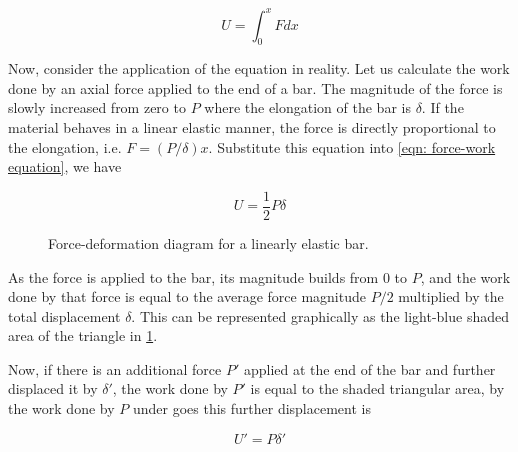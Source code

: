 \documentclass[
10pt,
a4paper,
openany,
svgnames,
]{book} %
\begin{document}
\begin{equation} \label{eqn: force-work equation}
  U = \int_0^x F dx
\end{equation}

Now, consider the application of the equation in reality. Let us calculate the work done by an axial force applied to the end of a bar. The magnitude of the force is slowly increased from zero to $P$ where the elongation of the bar is $\delta$. If the material behaves in a linear elastic manner, the force is directly proportional to the elongation, i.e. $F = (P/\delta)x$. Substitute this equation into \cref{eqn: force-work equation}, we have

\begin{equation}
  U = \frac{1}{2} P \delta
\end{equation}

\begin{figure}[h]
  \centering
  \caption{Force-deformation diagram for a linearly elastic bar.}
  \label{fig:force-deformation diagram}
\end{figure}

As the force is applied to the bar, its magnitude builds from 0 to $P$, and the work done by that force is equal to the average force magnitude $P/2$ multiplied by the total displacement $\delta$. This can be represented graphically as the light-blue shaded area of the triangle in \cref{fig:force-deformation diagram}.

Now, if there is an additional force $P'$ applied at the end of the bar and further displaced it by $\delta'$, the work done by $P'$ is equal to the shaded triangular area, by the work done by $P$ under goes this further displacement is

\begin{equation}
  U' = P \delta'
\end{equation}
\end{document}
